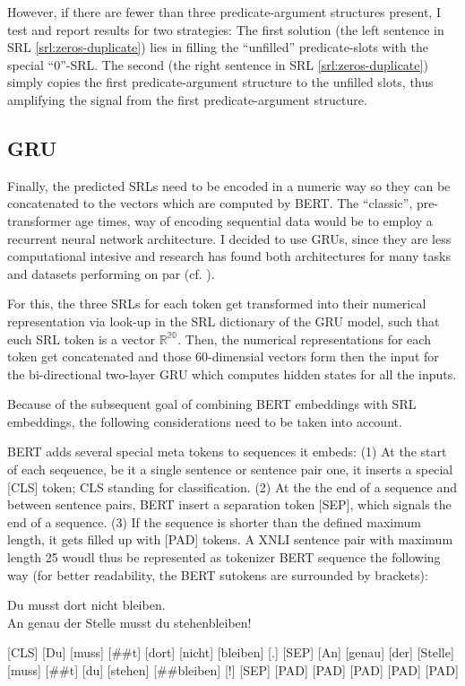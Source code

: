 However, if there are fewer than three predicate-argument structures
present, I test and report results for two strategies: The first solution (the left sentence
in SRL \ref{srl:zeros-duplicate}) lies in filling the ``unfilled'' predicate-slots with the
special ``0''-SRL. The second (the right sentence in SRL \ref{srl:zeros-duplicate}) simply
copies the first predicate-argument structure to the unfilled slots, thus amplifying the signal
from the first predicate-argument structure.



\subsection{GRU}

Finally, the predicted SRLs need to be encoded in a numeric way so they can be concatenated
to the vectors which are computed by BERT. The ``classic'', pre-transformer age times, way
of encoding sequential data would be to employ a recurrent neural network architecture.
I decided to use GRUs, since they are less computational intesive and research has found
both architectures for many tasks and datasets performing on par (cf. \cite{chung2014empirical}).

For this, the three SRLs for each token get transformed into their numerical representation
via look-up in the SRL dictionary of the GRU model, such that euch SRL token is a vector
$\mathbb{R^{20}}$. Then, the numerical representations for each token get concatenated and
those 60-dimensial vectors form then the input for the bi-directional two-layer GRU which
computes hidden states for all the inputs.

Because of the subsequent goal of combining BERT embeddings with SRL embeddings, the following
considerations need to be taken into account.


BERT adds several special meta tokens to sequences it embeds: (1) At the start of each
seqeuence, be it a single sentence or sentence pair one, it inserts a special [CLS] token; CLS
standing for classification. (2) At the the end of a sequence and between sentence pairs, BERT
insert a separation token [SEP], which signals the end of a sequence. (3) If the sequence
is shorter than the defined maximum length, it gets filled up with [PAD] tokens. A XNLI sentence
pair with maximum length 25 woudl thus be represented as tokenizer BERT sequence the following
way (for better readability, the BERT sutokens are surrounded by brackets):

\begin{examples}
  \item Du musst dort nicht bleiben.\\
        An genau der Stelle musst du stehenbleiben!

        [CLS] [Du] [muss] [\#\#t] [dort] [nicht] [bleiben] [.] [SEP] [An] [genau] [der] [Stelle] [muss] [\#\#t] [du] [stehen] [\#\#bleiben] [!] [SEP] [PAD]  [PAD]  [PAD]  [PAD]  [PAD]
\end{examples}

